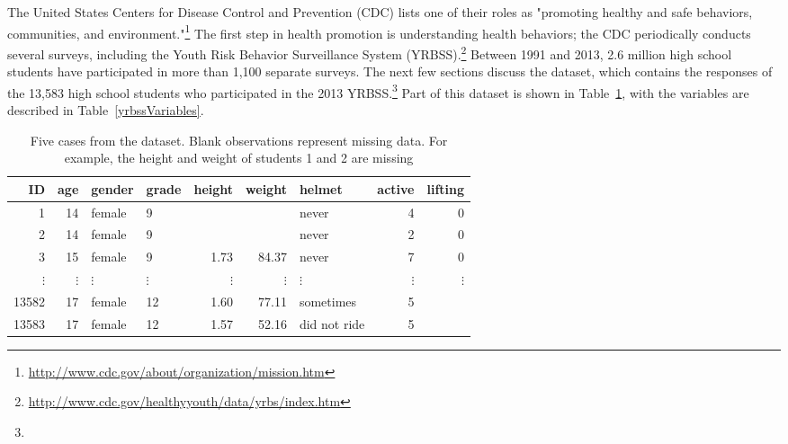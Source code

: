 \begin{spacing}{1.5}
The United States Centers for Disease Control and Prevention (CDC) lists one of their roles as "promoting healthy and safe behaviors, communities, and environment."\footnote{\url{http://www.cdc.gov/about/organization/mission.htm}} The first step in health promotion is understanding health behaviors; the CDC periodically conducts several surveys, including the Youth Risk Behavior Surveillance System (YRBSS).\footnote{\url{http://www.cdc.gov/healthyyouth/data/yrbs/index.htm}} Between 1991 and 2013, 2.6 million high school students have participated in more than 1,100 separate surveys. The next few sections discuss the  dataset, which contains the responses of the 13,583 high school students who participated in the 2013 YRBSS.\footnote{} Part of this dataset is shown in Table~\ref{yrbssDF}, with the variables are described in Table~\ref{yrbssVariables}.

\begin{table}[h]
\centering
\begin{tabular}{rrllrrlrr}
  \hline
ID & age & gender & grade & height & weight & helmet & active & lifting \\ 
  \hline
1 &  14 & female & 9 &  &  & never &   4 &   0 \\ 
  2 &  14 & female & 9 &  &  & never &   2 &   0 \\ 
  3 &  15 & female & 9 & 1.73 & 84.37 & never &   7 &   0 \\ 
  $\vdots$ & $\vdots$ & $\vdots$ & $\vdots$ & $\vdots$ & $\vdots$ & $\vdots$ & $\vdots$ & $\vdots$ \\
  13582 &  17 & female & 12 & 1.60 & 77.11 & sometimes &   5 &  \\ 
  13583 &  17 & female & 12 & 1.57 & 52.16 & did not ride &   5 &  \\ 
  \hline
\end{tabular}
\caption{Five cases from the  dataset. Blank observations represent missing data. For example, the height and weight of students 1 and 2 are missing\textC{\vspace{-2mm}}}
\label{yrbssDF}
\end{table}


\end{spacing}
